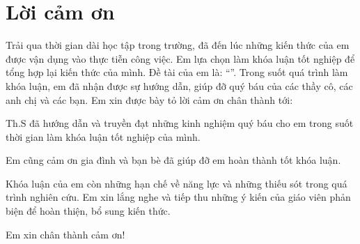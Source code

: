 \chapter*{Lời cảm ơn}
\label{thanks}

Trải qua thời gian dài học tập trong trường, đã đến lúc những kiến thức của em được vận dụng vào thực tiễn công việc. Em lựa chọn làm khóa luận tốt nghiệp để tổng hợp lại kiến thức của mình. Đề tài của em là: “\tenKL”. Trong suốt quá trình làm khóa luận, em đã nhận được sự hướng dẫn, giúp đỡ quý báu của các thầy cô, các anh chị và các bạn. Em xin được bày tỏ lời cảm ơn chân thành tới:

Th.S \tenGVHD đã hướng dẫn và truyền đạt những kinh nghiệm quý báu cho em trong suốt thời gian làm khóa luận tốt nghiệp của mình.

Em cũng cảm ơn gia đình và bạn bè đã giúp đỡ em hoàn thành tốt khóa luận.

Khóa luận của em còn những hạn chế về năng lực và những thiếu sót trong quá trình nghiên cứu. Em xin lắng nghe và tiếp thu những ý kiến của giáo viên phản biện để hoàn thiện, bổ sung kiến thức.

Em xin chân thành cảm ơn!